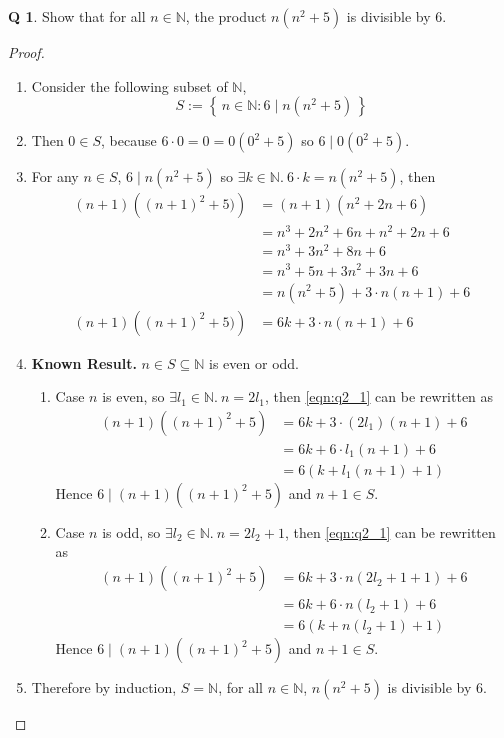 \documentclass[12pt]{article}
\newcommand{\set}[1]{\left\{\,#1\,\right\}}
\theoremstyle{definition}
\newtheorem{qn}{Q}
\numberwithin{equation}{qn}
\newcommand{\nat}{\mathbb{N}}
\newenvironment{prf}
{
    \begin{proof}
        \hfill
        \begin{enumerate}[label*=\arabic*.]
                }
                {
                \hfill\qedsymbol
        \end{enumerate}
    \renewcommand{\qedsymbol}{}
    \end{proof}
}
\begin{document}
\begin{qn}
    Show that for all $n\in\nat$, the product $n(n^2 + 5)$ is divisible by 6.
\end{qn}
\begin{prf}
\item Consider the following subset of $\nat$,
    $$S := \set{n \in\nat: 6 \mid n(n^2 +5)}$$
\item Then $0\in S$, because $6\cdot 0 = 0 = 0(0^2 + 5)$ so $6 \mid 0(0^2 + 5)$.
\item For any $n \in S$, $6 \mid n(n^2 + 5)$
    so $\exists k\in \nat.~ 6\cdot k = n(n^2 + 5)$, then
    \begin{align}
        (n+1)\left((n+1)^2 + 5)\right)
        &= (n+1)(n^2 + 2n + 6)              \\
        &= n^3 + 2n^2 + 6n + n^2 + 2n + 6   \\
        &= n^3 + 3n^2 + 8n + 6              \\
        &= n^3 + 5n + 3n^2 + 3n + 6         \\
        &= n(n^2 + 5) + 3\cdot n(n + 1) + 6 \\
        (n+1)\left((n+1)^2 + 5)\right)
        &= 6k + 3\cdot n(n+1) + 6           \label{eqn:q2_1}
    \end{align}
\item[] \textbf{Known Result.} $n \in S \subseteq \nat$ is even or odd.
    \begin{enumerate}[label=(\arabic*).]
        \item Case $n$ is even, so $\exists l_1\in \nat.~ n = 2l_1$,
            then \eqref{eqn:q2_1} can be rewritten as
            \begin{align*}
                (n+1)\left((n+1)^2 +5\right)
                &= 6k + 3\cdot(2l_1)(n+1) + 6 \\
                &= 6k + 6\cdot l_1(n+1) + 6   \\
                &= 6(k + l_1(n+1) + 1)
            \end{align*}
            Hence $6 \mid (n+1)\left((n+1)^2 +5\right)$ and $n + 1 \in S$.
        \item Case $n$ is odd, so $\exists l_2\in \nat.~ n = 2l_2 + 1$,
            then \eqref{eqn:q2_1} can be rewritten as
            \begin{align*}
                (n+1)\left((n+1)^2 +5\right)
                &= 6k + 3\cdot n(2l_2 + 1 +1) + 6 \\
                &= 6k + 6\cdot n(l_2 + 1) + 6   \\
                &= 6(k + n(l_2 + 1) + 1)
            \end{align*}
            Hence $6 \mid (n+1)\left((n+1)^2 +5\right)$ and $n + 1 \in S$.
    \end{enumerate}
\item Therefore by induction, $S = \nat$, for all $n\in\nat$, $n(n^2 + 5)$ is divisible by $6$.
\end{prf}
\end{document}
